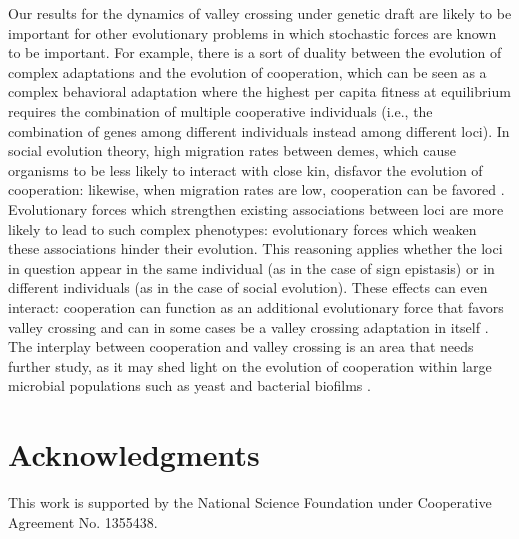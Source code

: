 \documentclass[10pt,twocolumn,twoside]{gsajnl}
\begin{document}
\begin{spacing}{1.5}
Our results for the dynamics of valley crossing under genetic draft are likely to be important for other evolutionary problems in which stochastic forces are known to be important.
For example, there is a sort of duality between the evolution of complex adaptations and the evolution of cooperation, which can be seen as a complex behavioral adaptation where the highest per capita fitness at equilibrium requires the combination of multiple cooperative individuals (i.e., the combination of genes among different individuals instead among different loci).
In social evolution theory, high migration rates between demes, which cause organisms to be less likely to interact with close kin, disfavor the evolution of cooperation: likewise, when migration rates are low, cooperation can be favored \citep{Hamilton:1970,Rousset:2004,van_cleve_2015}.
Evolutionary forces which strengthen existing associations between loci are more likely to lead to such complex phenotypes: evolutionary forces which weaken these associations hinder their evolution.
This reasoning applies whether the loci in question appear in the same individual (as in the case of sign epistasis) or in different individuals (as in the case of social evolution).
These effects can even interact: cooperation can function as an additional evolutionary force that favors valley crossing \citep{Obolski:Lewin-Epstein:2017} and can in some cases be a valley crossing adaptation in itself \citep{van_cleve_2013}.
The interplay between cooperation and valley crossing is an area that needs further study, as it may shed light on the evolution of cooperation within large microbial populations such as yeast \citep{gore_2009, gore_2013} and bacterial biofilms \citep{rainey_2003, van_gestel_2014}.


\section*{Acknowledgments}

This work is supported by the National Science Foundation under Cooperative Agreement No. 1355438.



\end{spacing}
\end{document}
